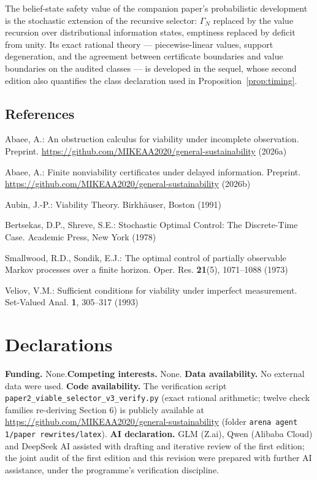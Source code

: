\documentclass[10pt,twocolumn]{article}
\theoremstyle{definition}
\begin{document}
The belief-state safety value of the companion paper's probabilistic
development is the stochastic extension of the recursive selector:
\(\Gamma_{N}\) replaced by the value recursion over distributional
information states, emptiness replaced by deficit from unity. Its exact
rational theory --- piecewise-linear values, support degeneration, and the
agreement between certificate boundaries and value boundaries on the audited
classes --- is developed in the sequel, whose second edition also
quantifies the class declaration used in Proposition~\ref{prop:timing}.

\subsection{References}\label{references}
{\footnotesize

Abaee, A.: An obstruction calculus for viability under incomplete
observation. Preprint.
\url{https://github.com/MIKEAA2020/general-sustainability} (2026a)

Abaee, A.: Finite nonviability certificates under delayed information.
Preprint. \url{https://github.com/MIKEAA2020/general-sustainability} (2026b)

Aubin, J.-P.: Viability Theory. Birkh\"auser, Boston (1991)

Bertsekas, D.P., Shreve, S.E.: Stochastic Optimal Control: The Discrete-Time
Case. Academic Press, New York (1978)

Smallwood, R.D., Sondik, E.J.: The optimal control of partially observable
Markov processes over a finite horizon. Oper. Res. \textbf{21}(5),
1071--1088 (1973)

Veliov, V.M.: Sufficient conditions for viability under imperfect
measurement. Set-Valued Anal. \textbf{1}, 305--317 (1993)

}

\section*{Declarations}

\textbf{Funding.} None.\quad \textbf{Competing interests.} None.\quad
\textbf{Data availability.} No external data were used.\quad
\textbf{Code availability.} The verification script
\texttt{paper2\_viable\_selector\_v3\_verify.py} (exact rational arithmetic; twelve check
families re-deriving Section 6) is publicly available at
\url{https://github.com/MIKEAA2020/general-sustainability} (folder
\texttt{arena agent 1/paper rewrites/latex}).\quad
\textbf{AI declaration.} GLM (Z.ai), Qwen (Alibaba Cloud) and DeepSeek AI
assisted with drafting and iterative review of the first edition; the
joint audit of the first edition and this revision were prepared with
further AI assistance, under the programme's verification discipline.
\end{document}
